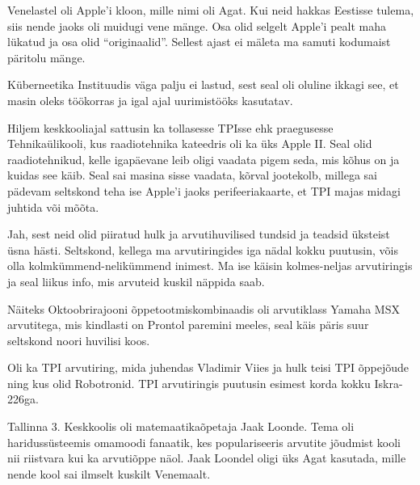 Venelastel oli Apple'i kloon, mille nimi oli Agat. 
Kui neid hakkas Eestisse tulema, siis nende jaoks oli muidugi vene 
mänge. Osa olid selgelt Apple'i pealt maha lükatud ja osa olid 
\enquote{originaalid}. Sellest ajast ei mäleta ma samuti kodumaist päritolu mänge.


Küberneetika Instituudis väga palju 
ei lastud, sest seal oli oluline ikkagi see, et masin oleks töökorras ja igal 
ajal uurimis{\-}tööks kasutatav.

Hiljem keskkooliajal sattusin ka tollasesse TPIsse ehk 
praegusesse Tehnikaülikooli, kus raadiotehnika 
kateedris oli ka üks Apple II. Seal olid 
raadiotehnikud, kelle igapäevane leib oligi vaadata pigem 
seda, mis kõhus on ja kuidas see käib. Seal sai masina sisse vaadata, 
kõrval jootekolb, millega sai pädevam seltskond teha ise Apple'i 
jaoks perifeeriakaarte, et TPI majas midagi juhtida või mõõta. 


Jah, sest neid olid piiratud hulk ja arvutihuvilised 
tundsid ja teadsid üksteist üsna hästi. Seltskond, kellega ma arvutiringides iga nädal kokku puutusin, 
võis olla kolmkümmend-nelikümmend inimest. 
Ma ise käisin kolmes-neljas arvutiringis ja seal liikus info, mis arvuteid kuskil näppida saab.

Näiteks Oktoobrirajooni õppetootmiskombinaadis oli arvutiklass Yamaha 
MSX arvutitega, mis kindlasti on Prontol 
paremini meeles, seal käis päris suur seltskond noori huvilisi koos. 

Oli ka TPI arvutiring, mida juhendas 
Vladimir Viies ja hulk teisi TPI õppejõude ning kus 
olid Robotronid. TPI arvutiringis 
puutusin esimest korda kokku Iskra-226ga.

Tallinna 3. Keskkoolis oli matemaatikaõpetaja Jaak Loonde. Tema oli haridussüsteemis omamoodi fanaatik, kes populariseeris 
arvutite jõudmist kooli nii riistvara kui ka arvutiõppe näol. Jaak Loondel oligi üks 
Agat kasutada, mille nende kool sai ilmselt kuskilt Venemaalt. 

